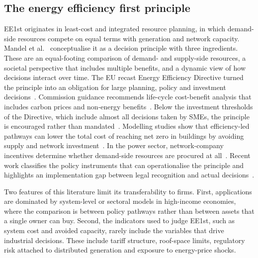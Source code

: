 \documentclass[processes,article,submit,pdftex,moreauthors]{Definitions/mdpi}
\begin{document}
\subsection{The energy efficiency first principle}
EE1st originates in least-cost and integrated resource planning, in which demand-side resources compete on equal terms with generation and network capacity. Mandel et al.~\cite{mandel2022} conceptualise it as a decision principle with three ingredients. These are an equal-footing comparison of demand- and supply-side resources, a societal perspective that includes multiple benefits, and a dynamic view of how decisions interact over time. The EU recast Energy Efficiency Directive turned the principle into an obligation for large planning, policy and investment decisions~\cite{eu2023eed}. Commission guidance recommends life-cycle cost-benefit analysis that includes carbon prices and non-energy benefits~\cite{ec2021ee1st,ec2024ee1st}. Below the investment thresholds of the Directive, which include almost all decisions taken by SMEs, the principle is encouraged rather than mandated~\cite{ec2024ee1st}. Modelling studies show that efficiency-led pathways can lower the total cost of reaching net zero in buildings by avoiding supply and network investment~\cite{mandel2023}. In the power sector, network-company incentives determine whether demand-side resources are procured at all~\cite{pato2022}. Recent work classifies the policy instruments that can operationalise the principle and highlights an implementation gap between legal recognition and actual decisions~\cite{mandel2024}.

Two features of this literature limit its transferability to firms. First, applications are dominated by system-level or sectoral models in high-income economies, where the comparison is between policy pathways rather than between assets that a single owner can buy. Second, the indicators used to judge EE1st, such as system cost and avoided capacity, rarely include the variables that drive industrial decisions. These include tariff structure, roof-space limits, regulatory risk attached to distributed generation and exposure to energy-price shocks.
\end{document}
